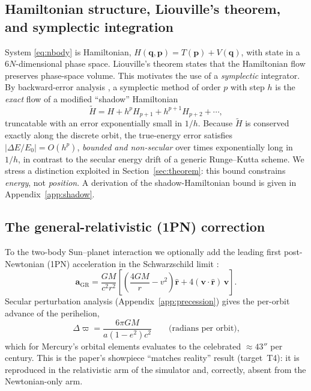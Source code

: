 \documentclass[11pt]{article}
\theoremstyle{definition}
\begin{document}
\subsection{Hamiltonian structure, Liouville's theorem, and symplectic integration}
\label{sec:symplectic}
System \eqref{eq:nbody} is Hamiltonian, $H(\mathbf q, \mathbf p) =
T(\mathbf p) + V(\mathbf q)$, with state in a $6N$-dimensional phase space.
Liouville's theorem \cite{liouville1838} states that the Hamiltonian flow
preserves phase-space volume. This motivates the use of a \emph{symplectic}
integrator. By backward-error analysis
\cite{benettingiorgilli1994, hairerlubichwanner2006}, a symplectic method of
order $p$ with step $h$ is the \emph{exact} flow of a modified ``shadow''
Hamiltonian
\begin{equation}
\tilde H = H + h^{p} H_{p+1} + h^{p+1} H_{p+2} + \cdots,
\end{equation}
truncatable with an error exponentially small in $1/h$. Because $\tilde H$ is
conserved exactly along the discrete orbit, the true-energy error satisfies
$|\Delta E / E_0| = O(h^p)$, \emph{bounded and non-secular} over times
exponentially long in $1/h$, in contrast to the secular energy drift of a
generic Runge--Kutta scheme. We stress a distinction exploited in
Section~\ref{sec:theorem}: this bound constrains \emph{energy}, not
\emph{position}. A derivation of the shadow-Hamiltonian bound is given in
Appendix~\ref{app:shadow}.

\subsection{The general-relativistic (1PN) correction}
\label{sec:gr}
To the two-body Sun--planet interaction we optionally add the leading
first post-Newtonian (1PN) acceleration in the Schwarzschild limit
\cite{einstein1915, eih1938}:
\begin{equation}
\label{eq:1pn}
\mathbf a_{\mathrm{GR}}
= \frac{GM}{c^2 r^2}
\left[\left(\frac{4GM}{r} - v^2\right)\hat{\mathbf r}
+ 4(\mathbf v \cdot \hat{\mathbf r})\,\mathbf v\right].
\end{equation}
Secular perturbation analysis (Appendix~\ref{app:precession}) gives the
per-orbit advance of the perihelion,
\begin{equation}
\label{eq:precession}
\Delta\varpi = \frac{6\pi G M}{a(1-e^2)c^2}
\qquad\text{(radians per orbit),}
\end{equation}
which for Mercury's orbital elements evaluates to the celebrated
$\approx 43''$ per century. This is the paper's showpiece
``matches reality'' result (target~T4): it is reproduced in the relativistic
arm of the simulator and, correctly, absent from the Newtonian-only arm.
\end{document}
